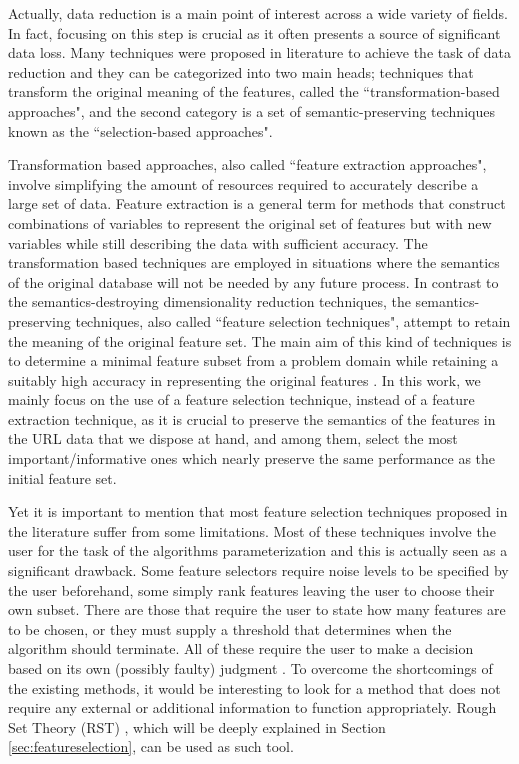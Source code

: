 \documentclass{llncs}
\begin{document}
Actually, data reduction %
is a main point of interest across a wide
variety of fields. In fact, focusing on this step is crucial as it
often presents a source of significant data loss. %
Many techniques were
proposed in literature to achieve the task of data reduction %
 and they
can be categorized into two main heads; techniques that transform the
original meaning of the features, called the ``transformation-based
approaches", and the second category is a set of semantic-preserving
techniques known as the ``selection-based approaches".

Transformation based approaches, also called ``feature extraction
approaches", involve simplifying the amount of resources required to
accurately describe a large set of data. Feature extraction is a
general term for methods that construct combinations of variables to
represent the original set of features but with new variables while
still describing the data with sufficient accuracy. The transformation
based techniques are employed in situations where the semantics of the
original database will not be needed by any future process. In
contrast to the semantics-destroying dimensionality reduction
techniques, the semantics-preserving techniques, also called ``feature
selection techniques", attempt to retain the meaning of the original
feature set. The main aim of this kind of techniques is to determine a
minimal feature subset from a problem domain while retaining a
suitably high accuracy in representing the original features
\cite{liu1998feature}. In this work, we mainly focus on the use of a
feature selection technique, instead of a feature extraction
technique, as it is crucial to preserve the semantics of the features
in the URL data that we dispose at hand, and among them, select the
most important/informative ones which nearly preserve  the same
performance as the initial feature set. 

Yet it is important to mention that most feature selection techniques
proposed in the literature suffer from some limitations. Most of these techniques involve the user for the task of the algorithms parameterization and this is actually seen as a significant drawback. Some feature selectors require noise levels to be specified by the user beforehand, some simply rank features leaving the user to choose their own subset. There are those that require the user to state how many features are to be chosen, or they must supply a threshold that determines when the algorithm should terminate. All of these require the user to make a decision based on its own (possibly faulty) judgment \cite{jensen2005semantics}. To overcome the shortcomings of the existing methods, it would be interesting to look for a method that does not require any external or additional information to function appropriately. Rough Set Theory (RST) \cite{pawlak2008rough}, which will be deeply explained in Section \ref{sec:featureselection}, can be used as such tool. 
 
\end{document}
